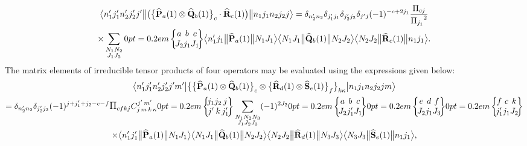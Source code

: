 \begin{multline*}
\braOketred{ n_{1}^{\prime} j_{1}^{\prime} n_{2}^{\prime} j_{2}^{\prime} j^{\prime}}{\bigl(\bigl\{\widehat{\vect{P}}_{a}(1) \otimes \widehat{\vect{Q}}_{b}(1)\bigr\}_{c} \cdot \widehat{\vect{R}}_{c}(1)\bigr)}{n_{1} j_{1} n_{2} j_{2} j}=\delta_{n_{2}^{\prime} n_{2}} \delta_{j_{1}^{\prime} j_{1}} \delta_{j_{2}^{\prime} j_{2}} \delta_{j^{\prime} j}(-1)^{-c+2 j_{1}}
\frac{\Fact{c j}}{\Fact{j_{1}}^{2}} \\
\times \sum_{\substack{N_{1} N_{2} \\ J_{1} J_{2}}}
\sixj{a}{b}{c}{J_{2}}{j_{1}}{J_{1}}
\braOketred{ n_{1}^{\prime} j_{1}}{\widehat{\vect{P}}_{a}(1)}{ N_{1} J_{1}}
\braOketred{ N_{1} J_{1}}{\widehat{\vect{Q}}_{b}(1)}{ N_{2} J_{2}}
\braOketred{ N_{2} J_{2}}{\widehat{\vect{R}}_{c}(1)}{ n_{1} j_{1}}.
\end{multline*}
The matrix elements of irreducible tensor products of four operators may be evaluated using the expressions given below:
\begin{multline}
\braOket{ n_{1}^{\prime} j_{1}^{\prime} n_{2}^{\prime} j_{2}^{\prime} j^{\prime} m^{\prime}}{\bigl\{\bigl\{\widehat{\vect{P}}_{a}(1) \otimes \widehat{\vect{Q}}_{b}(1)\bigr\}_{c} \otimes\bigl\{\widehat{\vect{R}}_{d}(1) \otimes \widehat{\vect{S}}_{e}(1)\bigr\}_{f}\bigr\}_{k \kappa}}{n_{1} j_{1} n_{2} j_{2} j m} \\
=\delta_{n_{2}^{\prime} n_{2}} \delta_{j_{2}^{\prime} j_{2}}(-1)^{j+j_{1}^{\prime}+j_{2}-c-f} \Fact{c f k j} 
\clebsch{j}{m}{k}{\kappa}{j^{\prime}}{m^{\prime}}
\sixj{j_{1}}{j_{2}}{j}{j^{\prime}}{k}{j_{1}^{\prime}} \sum_{\substack{N_{1} N_{2} N_{3} \\ J_{1} J_{2} J_{3}}}(-1)^{2 J_{2}}
\sixj{a}{b}{c}{J_{2}}{j_{1}^{\prime}}{J_{1}}
\sixj{e}{d}{f}{J_{2}}{j_{1}}{J_{3}}
\sixj{f}{c}{k}{j_{1}^{\prime}}{j_{1}}{J_{2}} \\
\times
\braOketred{n_{1}^{\prime} j_{1}^{\prime}}{\widehat{\vect{P}}_{a}(1)}{ N_{1} J_{1}}
\braOketred{ N_{1} J_{1}}{\widehat{\vect{Q}}_{b}(1)}{ N_{2} J_{2}}
\braOketred{ N_{2} J_{2}}{\widehat{\vect{R}}_{d}(1)}{ N_{3} J_{3}}
\braOketred{ N_{3} J_{3}}{\widehat{\vect{S}}_{e}(1)}{ n_{1} j_{1}},  \label{eq:13:1:46}
\end{multline}
